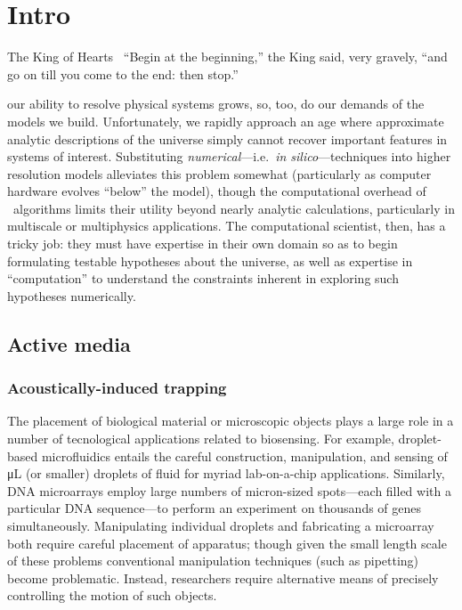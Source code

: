 \chapter{\label{ch:intro}Intro}

\begin{frontquote}{The King of Hearts~\cite{wonderland}}
``Begin at the beginning,'' the King said, very gravely, ``and go on till you come to the end: then stop.''
\end{frontquote}

 our ability to resolve physical systems grows, so, too, do our demands of the models we build.
Unfortunately, we rapidly approach an age where approximate analytic descriptions of the universe simply cannot recover important features in systems of interest.
Substituting \emph{numerical}---i.e.\ \emph{in silico}---techniques into higher resolution models alleviates this problem somewhat (particularly as computer hardware evolves ``below'' the model), though the computational overhead of \naive\ algorithms limits their utility beyond nearly analytic calculations, particularly in multiscale or multiphysics applications.
The computational scientist, then, has a tricky job: they must have expertise in their own domain so as to begin formulating testable hypotheses about the universe, as well as expertise in ``computation'' to understand the constraints inherent in exploring such hypotheses numerically.

\section{Active media}

\subsection{Acoustically-induced trapping}

The placement of biological material or microscopic objects plays a large role in a number of tecnological applications related to biosensing.
For example, droplet-based microfluidics entails the careful construction, manipulation, and sensing of \si{\micro\liter} (or smaller) droplets of fluid for myriad lab-on-a-chip applications.
Similarly, DNA microarrays employ large numbers of micron-sized spots---each filled with a particular DNA sequence---to perform an experiment on thousands of genes simultaneously.
Manipulating individual droplets and fabricating a microarray both require careful placement of apparatus; though given the small length scale of these problems conventional manipulation techniques (such as pipetting) become problematic.
Instead, researchers require alternative means of precisely controlling the motion of such objects.

